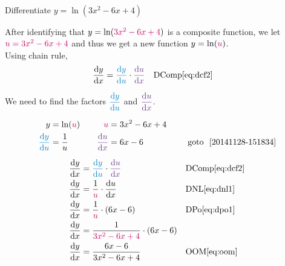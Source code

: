 \begin{example}[id:20141128-160248] \label{20141128-160248} \hfill \\

Differentiate $y=\ln(3x^2-6x+4)$

\soln

\solnsteps
After identifying that $y=\ln (\cRed{3x^2-6x+4})$ is a composite function, we let \\
$\cRed{u=3x^2-6x+4}$ and thus we get a new function $y=\ln (\cRed{u})$.\\

Using chain rule, 
\begin{align*}
\dydx &= \cBlue{\dydu} \cdot \cPurple{\dudx} && \text{DComp} \eqref{eq:dcf2}
\end{align*}

We need to find the factors $\cBlue{\dydu}$ and $\cPurple{\dudx}$.

\begin{alignat*}{3}
		y &= \ln (\cRed{u})				&\quad	 			\cRed{u} 	&= 3x^2-6x+4 	&\quad\\
	\cBlue{\dydu} &= \dfrac{1}{u}		&\quad 	 \cPurple{\dudx}	 &= 6x-6 		&\quad \text{\, goto \,} \, \ref{20141128-151834}
\end{alignat*}

\begin{align*}
\dydx &= \cBlue{\dydu} \cdot \cPurple{\dudx} && \text{DComp} \eqref{eq:dcf2} \\
\dydx &= \dfrac{1}{\cRed{u}} \cdot \dudx && \text{DNL} \eqref{eq:dnl1} \\
\dydx &= \dfrac{1}{\cRed{u}} \cdot (6x-6) && \text{DPo} \eqref{eq:dpo1} \\
\dydx &= \dfrac{1}{\cRed{3x^2-6x+4}} \cdot (6x-6) \\	%
\dydx &= \dfrac{6x-6}{3x^2-6x+4} && \text{OOM} \eqref{eq:oom} 
\end{align*}
\end{example}

